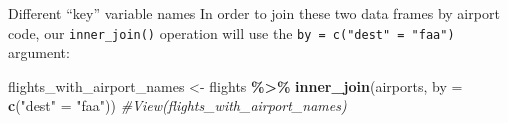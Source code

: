 \documentclass[
  ignorenonframetext,
]{beamer}
\newenvironment{Shaded}{\begin{snugshade}}{\end{snugshade}}
\newcommand{\AttributeTok}[1]{\textcolor[rgb]{0.13,0.29,0.53}{#1}}
\newcommand{\CommentTok}[1]{\textcolor[rgb]{0.56,0.35,0.01}{\textit{#1}}}
\newcommand{\FunctionTok}[1]{\textcolor[rgb]{0.13,0.29,0.53}{\textbf{#1}}}
\newcommand{\NormalTok}[1]{#1}
\newcommand{\OtherTok}[1]{\textcolor[rgb]{0.56,0.35,0.01}{#1}}
\newcommand{\SpecialCharTok}[1]{\textcolor[rgb]{0.81,0.36,0.00}{\textbf{#1}}}
\newcommand{\StringTok}[1]{\textcolor[rgb]{0.31,0.60,0.02}{#1}}
\begin{document}
\begin{frame}[fragile]{Different ``key'' variable names}
\protect\hypertarget{different-key-variable-names-1}{}
In order to join these two data frames by airport code, our
\texttt{inner\_join()} operation will use the
\texttt{by\ =\ c("dest"\ =\ "faa")} argument:

\small

\begin{Shaded}
\begin{Highlighting}[]
\NormalTok{flights\_with\_airport\_names }\OtherTok{\textless{}{-}}\NormalTok{ flights }\SpecialCharTok{\%\textgreater{}\%} 
  \FunctionTok{inner\_join}\NormalTok{(airports, }\AttributeTok{by =} \FunctionTok{c}\NormalTok{(}\StringTok{"dest"} \OtherTok{=} \StringTok{"faa"}\NormalTok{))}
\CommentTok{\#View(flights\_with\_airport\_names)}
\end{Highlighting}
\end{Shaded}

\normalsize
\end{frame}
\end{document}
